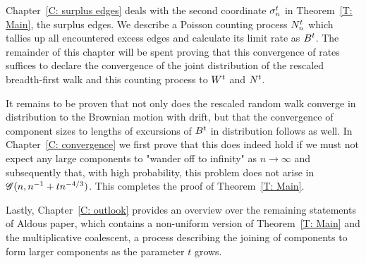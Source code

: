 Chapter~\ref{C: surplus edges} deals with the second coordinate $\mathcal{\sigma}^t_n$ in Theorem~\ref{T: Main}, the surplus edges.
We describe a Poisson counting process $N_n^t$ which tallies up all encountered excess edges and calculate its limit rate as $B^t$.
The remainder of this chapter will be spent proving that this convergence of rates suffices to declare the convergence of the joint distribution of
the rescaled breadth-first walk and this counting process to $W^t$ and $N^t$.

It remains to be proven that not only does the rescaled random walk converge in distribution to the Brownian motion with drift,
but that the convergence of component sizes to lengths of excursions of $B^t$ in distribution follows as well.
In Chapter~\ref{C: convergence} we first prove that this does indeed hold if we must not expect any large components to "wander off to infinity" as $n \rightarrow \infty$ and subsequently that, with high probability, this problem does not arise in $\mathscr{G}(n, n^{-1} + tn^{-4/3})$.
This completes the proof of Theorem~\ref{T: Main}.

Lastly, Chapter~\ref{C: outlook} provides an overview over the remaining statements of Aldous paper,
which contains a non-uniform version of Theorem~\ref{T: Main} and the multiplicative coalescent, 
a process describing the joining of components to form larger components as the parameter $t$ grows.

